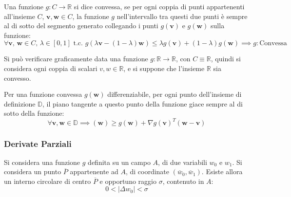 \documentclass{article}
\numberwithin{equation}{subsection}
\newcommand{\vect}[1]{\boldsymbol{\mathbf{#1}}}
\begin{document}
Una funzione $g:C\to\mathbb{R}$ si dice convessa, se per ogni coppia di punti appartenenti 
all'insieme $C$, $\vect{v},\vect{w}\in C$, la funzione $g$ nell'intervallo tra questi due punti è sempre al di sotto del segmento generato collegando i punti $g(\vect{v})$ e 
$g(\vect{w})$ sulla funzione:
\begin{equation}
    \forall\vect{v},\,\vect{w}\in C,\,\lambda\in[0,1]\text{ t.c. }g(\lambda\vect{v}-(1-\lambda)\vect{w})\leq\lambda g(\vect{v})+(1-\lambda)g(\vect{w})\implies g: \text{Convessa}
\end{equation}

Si può verificare graficamente data una funzione $g:\mathbb{R}\to\mathbb{R}$, con $C\equiv\mathbb{R}$, quindi si considera ogni coppia di scalari $v,w\in\mathbb{R}$, e si suppone che l'insieme $\mathbb{R}$ sia convesso. 



Per una funzione convessa $g(\vect{w})$ differenziabile, per ogni punto dell'insieme di 
definizione $\mathbb{D}$, il piano tangente a questo punto della funzione giace sempre al di sotto 
della funzione:
\begin{equation*}
    \forall\vect{v},\vect{w}\in \mathbb{D}\implies(\vect{w})\geq g(\vect{w})+\nabla g(\vect{v})^T(\vect{w-\vect{v}})
\end{equation*}

\subsubsection{Derivate Parziali}

Si considera una funzione $g$ definita su un campo $A$, di due variabili $w_0$ e $w_1$. Si 
considera un punto $\overline{P}$ appartenente ad $A$, di coordinate $(\overline{w}_0, \overline{w}_1)$. Esiste allora un interno circolare di centro $\overline{P}$ e opportuno 
raggio $\sigma$, contenuto in $A$:
\begin{equation*}
    0<|\Delta w_0|<\sigma
\end{equation*}
\end{document}
